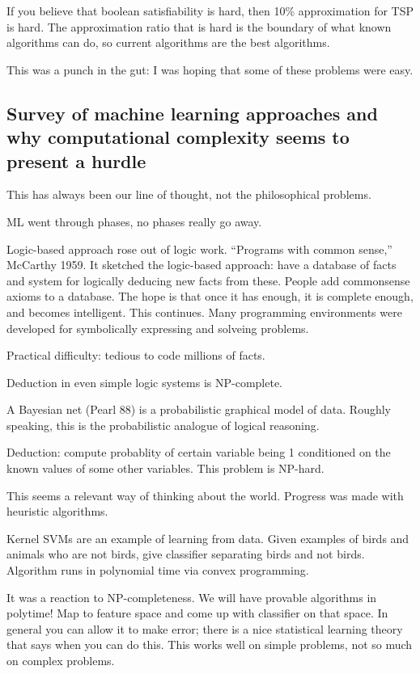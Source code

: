 If you believe that boolean satisfiability is hard, then 10\% approximation for TSP is hard. The approximation ratio that is hard is the boundary of what known algorithms can do, so current algorithms are the best algorithms.

This was a punch in the gut: I was hoping that some of these problems were easy.

\subsection{Survey of machine learning approaches and why computational complexity seems to present a hurdle}

This has always been our line of thought, not the philosophical problems.

ML went through phases, no phases really go away.

Logic-based approach rose out of logic work. ``Programs with common sense,'' McCarthy 1959. It sketched the logic-based approach: have a database of facts and system for logically deducing new facts from these. People add commonsense axioms to a database. %
The hope is that once it has enough, it is complete enough, and becomes intelligent. This continues. Many programming environments were developed for symbolically expressing and solveing problems.

Practical difficulty: tedious to code millions of facts.

Deduction in even simple logic systems is NP-complete.

A Bayesian net (Pearl 88) is a probabilistic graphical model of data. 
Roughly speaking, this is the probabilistic analogue of logical reasoning. 

Deduction: compute probablity of certain variable being 1 conditioned on the known values of some other variables. %
This problem is NP-hard.

This seems a relevant way of thinking about the world. Progress was made with heuristic algorithms.

Kernel SVMs are an example of learning from data. Given examples of birds and animals who are not birds, give classifier separating birds and not birds. Algorithm runs in polynomial time via convex programming. 

It was a reaction to NP-completeness. We will have provable algorithms in polytime! Map to feature space and come up with classifier on that space. In general you can allow it to make error; there is a nice statistical learning theory that says when you can do this. This works well on simple problems, not so much on complex problems.

